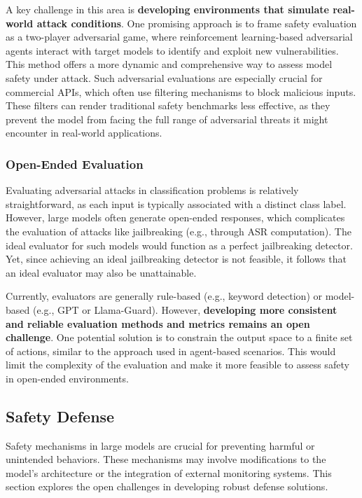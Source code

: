 A key challenge in this area is \textbf{developing environments that simulate real-world attack conditions}. One promising approach is to frame safety evaluation as a two-player adversarial game, where reinforcement learning-based adversarial agents interact with target models to identify and exploit new vulnerabilities. This method offers a more dynamic and comprehensive way to assess model safety under attack.
Such adversarial evaluations are especially crucial for commercial APIs, which often use filtering mechanisms to block malicious inputs. These filters can render traditional safety benchmarks less effective, as they prevent the model from facing the full range of adversarial threats it might encounter in real-world applications.

\subsubsection{Open-Ended Evaluation}
Evaluating adversarial attacks in classification problems is relatively straightforward, as each input is typically associated with a distinct class label. However, large models often generate open-ended responses, which complicates the evaluation of attacks like jailbreaking (e.g., through ASR computation). The ideal evaluator for such models would function as a perfect jailbreaking detector. Yet, since achieving an ideal jailbreaking detector is not feasible, it follows that an ideal evaluator may also be unattainable.

Currently, evaluators are generally rule-based (e.g., keyword detection) or model-based (e.g., GPT or Llama-Guard). However, \textbf{developing more consistent and reliable evaluation methods and metrics remains an open challenge}. One potential solution is to constrain the output space to a finite set of actions, similar to the approach used in agent-based scenarios. This would limit the complexity of the evaluation and make it more feasible to assess safety in open-ended environments.



\subsection{Safety Defense}

Safety mechanisms in large models are crucial for preventing harmful or unintended behaviors. These mechanisms may involve modifications to the model's architecture or the integration of external monitoring systems. This section explores the open challenges in developing robust defense solutions.

